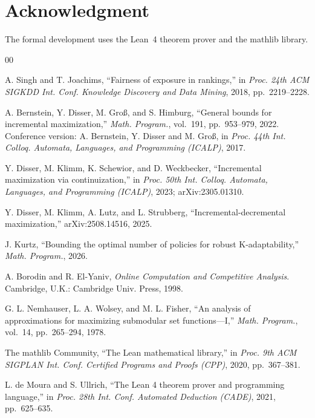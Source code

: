 \section*{Acknowledgment}

The formal development uses the Lean~4 theorem prover and the mathlib library.

\begin{thebibliography}{00}

 A. Singh and T. Joachims, ``Fairness of exposure in rankings,'' in
\emph{Proc. 24th ACM SIGKDD Int. Conf. Knowledge Discovery and Data Mining}, 2018,
pp.~2219--2228.

 A. Bernstein, Y. Disser, M. Gro\ss{}, and S. Himburg, ``General
bounds for incremental maximization,'' \emph{Math. Program.}, vol.~191, pp.~953--979, 2022.
Conference version: A. Bernstein, Y. Disser and M. Gro\ss{}, in \emph{Proc. 44th Int. Colloq.
Automata, Languages, and Programming (ICALP)}, 2017.

 Y. Disser, M. Klimm, K. Schewior, and D. Weckbecker, ``Incremental
maximization via continuization,'' in \emph{Proc. 50th Int. Colloq. Automata, Languages, and
Programming (ICALP)}, 2023; arXiv:2305.01310.

 Y. Disser, M. Klimm, A. Lutz, and L. Strubberg,
``Incremental-decremental maximization,'' arXiv:2508.14516, 2025.

 J. Kurtz, ``Bounding the optimal number of policies for robust
K-adaptability,'' \emph{Math. Program.}, 2026.

 A. Borodin and R. El-Yaniv, \emph{Online Computation and Competitive
Analysis}. Cambridge, U.K.: Cambridge Univ. Press, 1998.

 G. L. Nemhauser, L. A. Wolsey, and M. L. Fisher, ``An analysis of
approximations for maximizing submodular set functions---I,'' \emph{Math. Program.},
vol.~14, pp.~265--294, 1978.

 The mathlib Community, ``The Lean mathematical library,'' in
\emph{Proc. 9th ACM SIGPLAN Int. Conf. Certified Programs and Proofs (CPP)}, 2020,
pp.~367--381.

 L. de Moura and S. Ullrich, ``The Lean 4 theorem prover and
programming language,'' in \emph{Proc. 28th Int. Conf. Automated Deduction (CADE)}, 2021,
pp.~625--635.

\end{thebibliography}




